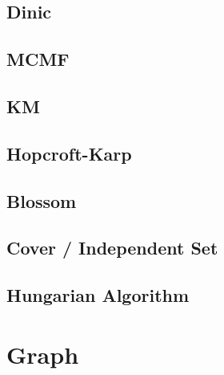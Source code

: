 \documentclass[a4paper,10pt,twocolumn,oneside,x11names]{article}
\begin{document}
\subsection{Dinic}


%

\subsection{MCMF}


\subsection{KM}


\subsection{Hopcroft-Karp}


\subsection{Blossom}


% 

\subsection{Cover / Independent Set}


\subsection{Hungarian Algorithm}



\section{Graph}
\end{document}
